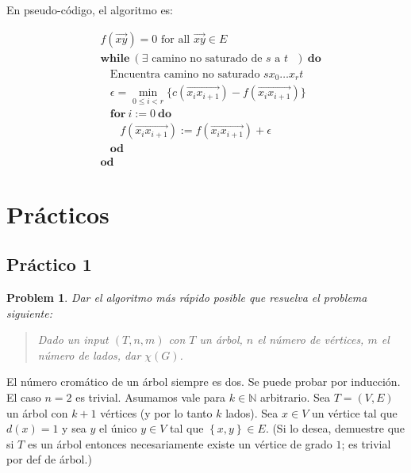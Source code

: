 \documentclass[a4paper, 12pt]{article}
\newtheorem{problem}{Problem}
\newtheorem{problem}{Problem}
\begin{document}
En pseudo-código, el algoritmo es:


\begin{align*}
    &f(\overrightarrow{xy}) = 0 \text{ for all $\overrightarrow{xy} \in E$ } \\ 
    &\textbf{while} ~ (\exists \text{ camino no saturado de $s$ a $t$ })
    ~\textbf{do}\\
    & ~ ~ ~ ~ \text{Encuentra camino no saturado $sx_0 \ldots x_{r} t$}\\
    &~ ~ ~ ~ \epsilon = \min_{0 \leq i < r} \Big\{ c(\overrightarrow{x_i x_{i+1}}) -
    f(\overrightarrow{x_i x_{i+1}})\Big\}\\
    &~ ~ ~ ~ \textbf{for} ~ i := 0 ~ \textbf{do}\\ 
    &~ ~ ~ ~  ~ ~ ~ ~  f(\overrightarrow{x_i x_{i+1}}) := f(\overrightarrow{x_i x_{i+1}}) + \epsilon \\
    &~ ~ ~ ~ \textbf{od} \\ 
    &\textbf{od}
\end{align*}












\pagebreak


\section{Prácticos}

\subsection{Práctico 1}

\begin{problem}
    Dar el algoritmo más rápido posible que resuelva el problema siguiente: 

    \begin{quote}
        Dado un input $(T, n, m)$ con $T$ un árbol, $n$ el número de vértices,
        $m$ el número de lados, dar $\chi(G)$.
    \end{quote}
\end{problem}

El número cromático de un árbol siempre es dos. Se puede probar por inducción.
El caso $n = 2$ es trivial. Asumamos vale para $k \in \mathbb{N}$ arbitrario.
Sea $T = (V, E)$ un árbol con $k + 1$ vértices (y por lo tanto $k$ lados).
Sea $x \in V$ un vértice tal que $d(x) = 1$ y sea $y$ el único $y \in V$ tal que
$\left\{ x, y \right\} \in E $. (Si lo desea, demuestre que si $T$
es un árbol entonces necesariamente existe un vértice de grado $1$; es trivial
por def de árbol.) 
\end{document}
